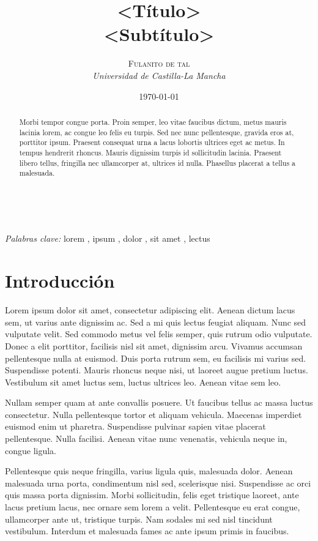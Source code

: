 \documentclass[a4paper, 11pt]{article} %
\title{\textbf{<Título>}\\
<Subtítulo>}
\author{\textsc{Fulanito de tal}
\\{\textit{Universidad de Castilla-La Mancha}}}
\date{\today}
\makeatletter
\renewcommand{\maketitle}{ %
\begin{flushright} %
{\LARGE\@title} %

\vspace{50pt} %

{\large\@author} %
\\\@date %

\vspace{40pt} %
\end{flushright}
}
\makeatother
\begin{document}
\maketitle


\begin{abstract}
Morbi tempor congue porta. Proin semper, leo vitae faucibus dictum, metus mauris lacinia lorem, ac congue leo felis eu turpis. Sed nec nunc pellentesque, gravida eros at, porttitor ipsum. Praesent consequat urna a lacus lobortis ultrices eget ac metus. In tempus hendrerit rhoncus. Mauris dignissim turpis id sollicitudin lacinia. Praesent libero tellus, fringilla nec ullamcorper at, ultrices id nulla. Phasellus placerat a tellus a malesuada.
\end{abstract}

\hspace*{3,6mm}\textit{Palabras clave:} lorem , ipsum , dolor , sit amet , lectus %

\vspace{30pt} %



\section*{Introducción}

Lorem ipsum dolor sit amet, consectetur adipiscing elit. Aenean dictum lacus sem, ut varius ante dignissim ac. Sed a mi quis lectus feugiat aliquam. Nunc sed vulputate velit. Sed commodo metus vel felis semper, quis rutrum odio vulputate. Donec a elit porttitor, facilisis nisl sit amet, dignissim arcu. Vivamus accumsan pellentesque nulla at euismod. Duis porta rutrum sem, eu facilisis mi varius sed. Suspendisse potenti. Mauris rhoncus neque nisi, ut laoreet augue pretium luctus. Vestibulum sit amet luctus sem, luctus ultrices leo. Aenean vitae sem leo.

Nullam semper quam at ante convallis posuere. Ut faucibus tellus ac massa luctus consectetur. Nulla pellentesque tortor et aliquam vehicula. Maecenas imperdiet euismod enim ut pharetra. Suspendisse pulvinar sapien vitae placerat pellentesque. Nulla facilisi. Aenean vitae nunc venenatis, vehicula neque in, congue ligula.

Pellentesque quis neque fringilla, varius ligula quis, malesuada dolor. Aenean malesuada urna porta, condimentum nisl sed, scelerisque nisi. Suspendisse ac orci quis massa porta dignissim. Morbi sollicitudin, felis eget tristique laoreet, ante lacus pretium lacus, nec ornare sem lorem a velit. Pellentesque eu erat congue, ullamcorper ante ut, tristique turpis. Nam sodales mi sed nisl tincidunt vestibulum. Interdum et malesuada fames ac ante ipsum primis in faucibus.
\end{document}
